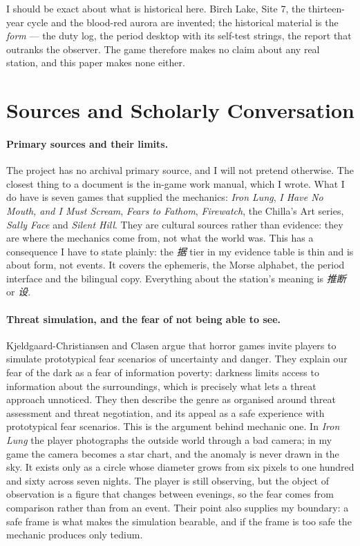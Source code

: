 \documentclass[12pt,a4paper]{article}
\begin{document}
I should be exact about what is historical here. Birch Lake, Site 7, the
thirteen-year cycle and the blood-red aurora are invented; the historical material
is the \emph{form} — the duty log, the period desktop with its self-test strings,
the report that outranks the observer. The game therefore makes no claim about any
real station, and this paper makes none either.

\section{Sources and Scholarly Conversation}

\paragraph{Primary sources and their limits.}
The project has no archival primary source, and I will not pretend otherwise. The
closest thing to a document is the in-game work manual, which I wrote. What I do
have is seven games that supplied the mechanics: \emph{Iron Lung},
\emph{I Have No Mouth, and I Must Scream}, \emph{Fears to Fathom},
\emph{Firewatch}, the Chilla's Art series, \emph{Sally Face} and
\emph{Silent Hill}.\autocite{ironlung2022,ihavenomouth1995,fearstofathom2021,firewatch2016,chillasart2018,sallyface2016,silenthill1999}
They are cultural sources rather than evidence: they are where the mechanics come
from, not what the world was. This has a consequence I have to state plainly: the
\emph{据} tier in my evidence table is thin and is about form, not events. It
covers the ephemeris, the Morse alphabet, the period interface and the bilingual
copy. Everything about the station's meaning is \emph{推断} or \emph{设}.

\paragraph{Threat simulation, and the fear of not being able to see.}
Kjeldgaard-Christiansen and Clasen argue that horror games invite players to
simulate prototypical fear scenarios of uncertainty and danger.\autocite[2]{kjeldgaard2019threat}
They explain our fear of the dark as a fear of information poverty: darkness
limits access to information about the surroundings, which is precisely what lets
a threat approach unnoticed.\autocite[4]{kjeldgaard2019threat} They then describe
the genre as organised around threat assessment and threat negotiation, and its
appeal as a safe experience with prototypical fear
scenarios.\autocite[11]{kjeldgaard2019threat} This is the argument behind mechanic
one. In \emph{Iron Lung} the player photographs the outside world through a bad
camera;\autocite{ironlung2022} in my game the camera becomes a star chart, and the
anomaly is never drawn in the sky. It exists only as a circle whose diameter grows
from six pixels to one hundred and sixty across seven nights. The player is still
observing, but the object of observation is a figure that changes between
evenings, so the fear comes from comparison rather than from an event. Their point
also supplies my boundary: a safe frame is what makes the simulation bearable, and
if the frame is too safe the mechanic produces only tedium.
\end{document}
